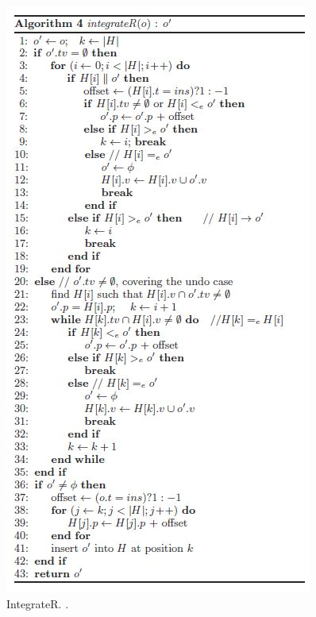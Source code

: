 \documentclass[11pt, a4paper, oneside, openright]{article} %
\begin{document}
\begin{figure}[!h]
\begin{center}
\includegraphics[scale=0.75]{snapshots/integrateR.jpg}
\end{center}
\caption{IntegrateR. \cite{abtuu}.\label{snap4}}
\end{figure}
\end{document}
